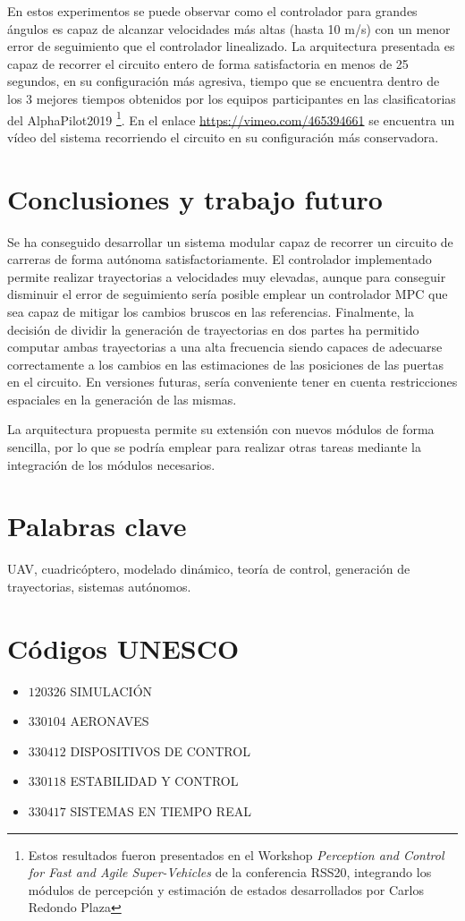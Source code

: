 En estos experimentos se puede observar como el controlador para grandes ángulos es capaz de alcanzar velocidades más altas (hasta 10 m/s) con un menor error de seguimiento que el controlador linealizado. La arquitectura presentada es capaz de recorrer el circuito entero de forma satisfactoria en menos de 25 segundos, en su configuración más agresiva, tiempo que se encuentra dentro de los 3 mejores tiempos obtenidos por los equipos participantes en las clasificatorias del AlphaPilot2019 \cite{guerra2019flightgoggles} \footnote{Estos resultados fueron presentados en el Workshop  \textit{Perception and Control for Fast and Agile Super-Vehicles} de la conferencia RSS20, integrando los módulos de percepción y estimación de estados desarrollados por Carlos Redondo Plaza}. En el enlace \url{https://vimeo.com/465394661} se encuentra un vídeo del sistema recorriendo el circuito en su configuración más conservadora. 


\section*{Conclusiones y trabajo futuro}

Se ha conseguido desarrollar un sistema modular capaz de recorrer un circuito de carreras de forma autónoma satisfactoriamente. El controlador implementado permite realizar trayectorias a velocidades muy elevadas, aunque para conseguir disminuir el error de seguimiento sería posible emplear un controlador MPC que sea capaz de mitigar los cambios bruscos en las referencias. Finalmente, la decisión de dividir la generación de trayectorias en dos partes ha permitido computar ambas trayectorias a una alta frecuencia siendo capaces de adecuarse correctamente a los cambios en las estimaciones de las posiciones de las puertas en el circuito. En versiones futuras, sería conveniente tener en cuenta restricciones espaciales en la generación de las mismas.

La arquitectura propuesta permite su extensión con nuevos módulos de forma sencilla, por lo que se podría emplear para realizar otras tareas mediante la integración de los módulos necesarios.

\newpage
\section*{Palabras clave}
UAV, cuadricóptero, modelado dinámico, teoría de control, generación de trayectorias, sistemas autónomos.

\section*{Códigos UNESCO}
\begin{itemize}
	\item[] $120326$ \quad SIMULACIÓN
	\item[] $330104$ \quad AERONAVES
	\item[] $330412$ \quad DISPOSITIVOS DE CONTROL
	\item[]	$330118$ \quad ESTABILIDAD Y CONTROL
	\item[] $330417$ \quad SISTEMAS EN TIEMPO REAL 
		

\end{itemize}
\newpage
\cleardoublepage